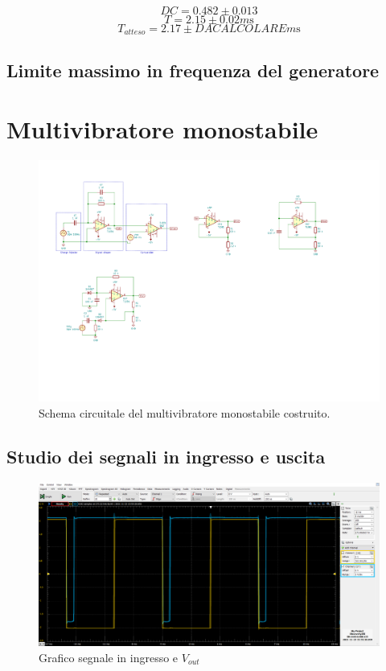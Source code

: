 \documentclass[10pt,a4paper]{article}
\begin{document}
\[
DC = 0.482 \pm 0.013
\]
\[
T = 2.15 \pm 0.02 \si{m\s}
\]
\[
T_{atteso} = 2.17 \pm  D A   C A L C O L A R E \si{m\s}
\]

\subsection{Limite massimo in frequenza del generatore}

\section{Multivibratore monostabile}
\begin{figure}[htbp]
    \centering
	\includegraphics[scale=1.2]{monostable}
    \caption{Schema circuitale del multivibratore monostabile costruito.
    \label{fig: monostableschm}}
\end{figure}

\subsection{Studio dei segnali in ingresso e uscita}

\begin{figure}[htbp]
\centering
\includegraphics[scale=0.42]{monostabile}
\caption{Grafico segnale in ingresso e $V_{out}$}
\end{figure}
\end{document}
